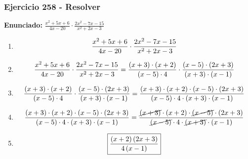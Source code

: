 \documentclass[11pt,a4paper]{article}
\newcommand{\fitmath}[1]{%
\[
\setbox0=\hbox{$\displaystyle #1$}%
\ifdim\wd0>\linewidth
\resizebox{\linewidth}{!}{$\displaystyle #1$}%
\else
#1%
\fi
\]
}
\begin{document}
\subsubsection*{Ejercicio 258 - Resolver}
\textbf{Enunciado:} $ \frac{x^{2} + 5 x + 6}{4 x - 20} \cdot \frac{2 x^{2} - 7 x - 15}{x^{2} + 2 x - 3} $\par
\begin{enumerate}[leftmargin=2em]
\item \fitmath{\frac{x^{2} + 5 x + 6}{4 x - 20} \cdot \frac{2 x^{2} - 7 x - 15}{x^{2} + 2 x - 3}}
\item \fitmath{\frac{x^{2} + 5 x + 6}{4 x - 20} \cdot \frac{2 x^{2} - 7 x - 15}{x^{2} + 2 x - 3}= \frac{\left(x + 3\right)\cdot \left(x + 2\right)}{\left(x - 5\right)\cdot 4} \cdot \frac{\left(x - 5\right)\cdot \left(2 x + 3\right)}{\left(x + 3\right)\cdot \left(x - 1\right)}}
\item \fitmath{\frac{\left(x + 3\right)\cdot \left(x + 2\right)}{\left(x - 5\right)\cdot 4}\cdot \frac{\left(x - 5\right)\cdot \left(2 x + 3\right)}{\left(x + 3\right)\cdot \left(x - 1\right)}= \frac{\left(x + 3\right)\cdot \left(x + 2\right)\cdot \left(x - 5\right)\cdot \left(2 x + 3\right)}{\left(x - 5\right)\cdot 4\cdot \left(x + 3\right)\cdot \left(x - 1\right)}}
\item \fitmath{\frac{\left(x + 3\right)\cdot \left(x + 2\right)\cdot \left(x - 5\right)\cdot \left(2 x + 3\right)}{\left(x - 5\right)\cdot 4\cdot \left(x + 3\right)\cdot \left(x - 1\right)}= \frac{\cancel{\left(x + 3\right)}\cdot \left(x + 2\right)\cdot \cancel{\left(x - 5\right)}\cdot \left(2 x + 3\right)}{\cancel{\left(x - 5\right)}\cdot 4\cdot \cancel{\left(x + 3\right)}\cdot \left(x - 1\right)}}
\item \fitmath{\boxed{\frac{\left(x + 2\right) \left(2 x + 3\right)}{4 \left(x - 1\right)}}}
\end{enumerate}

\vspace{0.12cm}
\end{document}
